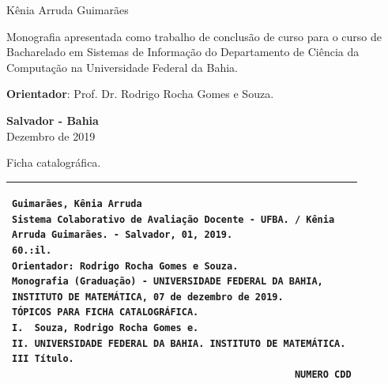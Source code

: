 \documentclass[12pt, a4paper]{report}
\begin{document}
\newpage
\begin{center}

\vspace{4cm}

\large{Kênia Arruda Guimarães}
\end{center}

\vspace{4cm}

\begin{flushright}
\begin{minipage}{8.6cm}
Monografia apresentada como trabalho de conclusão de curso para o curso de Bacharelado em Sistemas de Informação do Departamento de Ciência da Computação na Universidade Federal da Bahia.

\vspace{0.5cm}
\textbf{Orientador}: Prof. Dr. Rodrigo Rocha Gomes e Souza.

\end{minipage}
\end{flushright}
 
\vspace{7cm}

\begin{center}
\textbf{Salvador - Bahia} \\
Dezembro de 2019
\end{center}



\newpage
\thispagestyle{empty}
\null\vfill
                  
\begin{center}
 Ficha catalográfica.
\begin{tabular}{|p{13.5cm}|}%
\hline
\begin{small}
\begin{verbatim}
Guimarães, Kênia Arruda
Sistema Colaborativo de Avaliação Docente - UFBA. / Kênia
Arruda Guimarães. - Salvador, 01, 2019.
60.:il.
Orientador: Rodrigo Rocha Gomes e Souza.
Monografia (Graduação) - UNIVERSIDADE FEDERAL DA BAHIA,
INSTITUTO DE MATEMÁTICA, 07 de dezembro de 2019.
TÓPICOS PARA FICHA CATALOGRÁFICA.
I.  Souza, Rodrigo Rocha Gomes e. 
II. UNIVERSIDADE FEDERAL DA BAHIA. INSTITUTO DE MATEMÁTICA.
III Título.
                                                  NUMERO CDD
\end{verbatim}
\end{small}
\\ \hline
\end{tabular}
\end{center}
\end{document}
